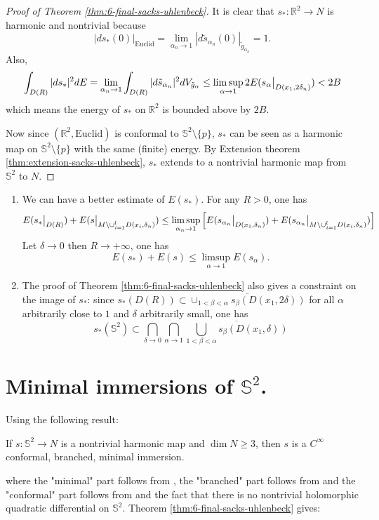 \begin{proof}[Proof of Theorem \ref{thm:6-final-sacks-uhlenbeck}]
It is clear that \(s_*: \mathbb{R}^2 \longrightarrow N\) is harmonic and nontrivial
because
\[
 \left| ds_*(0)\right|_{\text{Euclid}} = \lim_{\alpha_{n}\to 1}|d\tilde s_{\alpha_n}(0)|_{\tilde
g_{\alpha_n}} = 1.
\]
Also,
\[
 \int_{D(R)}|ds_*|^2 dE = \lim_{\alpha_n \to 1}\int_{D(R)} |d\tilde
s_{\alpha_n}|^2dV_{\tilde g_\alpha} \leq \limsup_{\alpha\to 1}
2E(\restr{s_{\alpha}}{D(x_1,2\delta_n)}) < 2B
\]
which means the energy of \(s_*\) on \(\mathbb{R}^2\) is bounded above by \(2B\).

Now since \((\mathbb{R}^2, \text{Euclid})\) is conformal to \(\mathbb{S}^2\setminus\{p\}\), \(s_*\) can be seen as a harmonic map on \(\mathbb{S}^2\setminus\{p\}\) with the
same (finite) energy. By Extension theorem \ref{thm:extension-sacks-uhlenbeck}, \(s_*\)
extends to a nontrivial harmonic map from \(\mathbb{S}^2\) to \(N\).
\end{proof}


\begin{remark}
\label{rem:final-sacks-uhlenbeck}
\begin{enumerate}
\item We can have a better estimate of \(E(s_*)\). For any \(R>0\), one has
\[
    E(\restr{s_*}{D(R)}) + E(\restr{s}{M\setminus \cup_{i=1}^l D(x_i,\delta_n)}) \leq
    \limsup_{\alpha_n\to 1} \left[E(\restr{s_{\alpha_n}}{D(x_1,\delta_n)}) + E(\restr{s_{\alpha_n}}{M\setminus\cup_{i=1}^l D(x_i,\delta_n)})\right]
   \]
 Let \(\delta \to 0\) then \(R\to +\infty\), one has
\[
   E(s_*) + E(s) \leq \limsup_{\alpha\to 1} E(s_\alpha).
   \]
\item The proof of Theorem \ref{thm:6-final-sacks-uhlenbeck} also gives a constraint on the
image of \(s_*\): since \(s_*(D(R))\subset
   \overline{\cup_{1<\beta<\alpha}s_\beta(D(x_1,2\delta))}\) for all \(\alpha\)
arbitrarily close to \(1\) and \(\delta\) arbitrarily small, one has
\[
   s_*(\mathbb{S}^2)\subset \bigcap_{\delta \to 0}\bigcap_{\alpha \to 1}
   \overline{\bigcup_{1<\beta<\alpha}s_\beta(D(x_1, \delta))}
   \]
\end{enumerate}
\end{remark}



\section{Minimal immersions of \(\mathbb{S}^2\).}
\label{sec:org8c1ce33}

Using the following result:

\begin{theorem}
If \(s: \mathbb{S}^2 \longrightarrow N\) is a nontrivial harmonic map and \(\dim N\geq
3\), then \(s\) is a \(C^\infty\) conformal, branched, minimal immersion.
\end{theorem}
where the "minimal" part follows from \cite{eells_harmonic_1964}, the "branched" part
follows from \cite{gulliver_theory_1973} and the "conformal" part follows from
\cite{chern_volume_1975} and the fact that there is no nontrivial holomorphic quadratic
differential on \(\mathbb{S}^2\). Theorem \ref{thm:6-final-sacks-uhlenbeck} gives:

